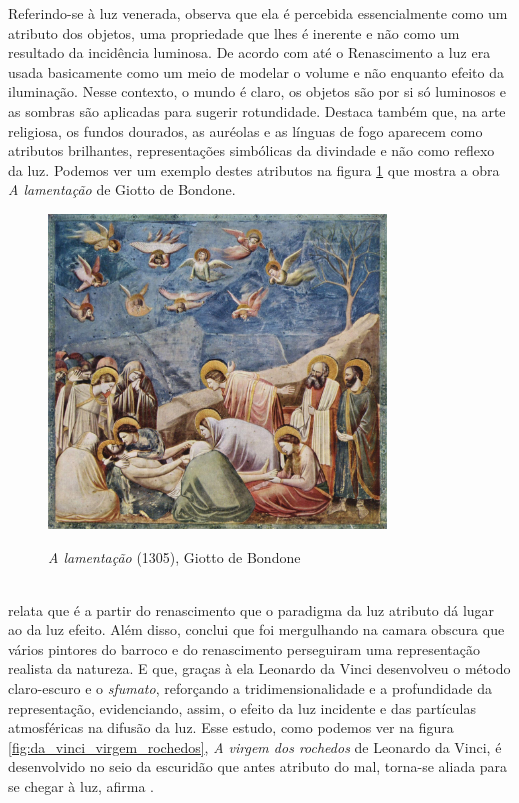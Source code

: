 Referindo-se à luz venerada,  observa que ela é percebida essencialmente como um atributo dos objetos, uma propriedade que lhes é inerente e não como um resultado da incidência luminosa. De acordo com  até o Renascimento a luz era usada basicamente como um meio de modelar o volume e não enquanto efeito da iluminação. Nesse contexto, o mundo é claro, os objetos são por si só luminosos e as sombras são aplicadas para sugerir rotundidade. Destaca também que, na arte religiosa, os fundos dourados, as auréolas e as línguas de fogo aparecem como atributos brilhantes, representações simbólicas da divindade e não como reflexo da luz. Podemos ver um exemplo destes atributos na figura \ref{fig:giotto_lamentacao} que mostra a obra \textit{A lamentação} de Giotto de Bondone.

\begin{figure}[H]
    \centering
    \caption{\textit{A lamentação} (1305), Giotto de Bondone}
	\vspace*{0,2cm}
    \includegraphics[width=0.8\textwidth]{./04-figuras/giotto_lamentacao}
    \label{fig:giotto_lamentacao}
\end{figure}
\vspace*{-0,9cm}
{\raggedright {}}\\

 relata que é a partir do renascimento que o paradigma da luz atributo dá lugar ao da luz efeito. Além disso, conclui que foi mergulhando na camara obscura que vários pintores do barroco e do renascimento perseguiram uma representação realista da natureza. E que, graças à ela Leonardo da Vinci desenvolveu o método claro-escuro e o \textit{sfumato}, reforçando a tridimensionalidade e a profundidade da representação, evidenciando, assim, o efeito da luz incidente e das partículas atmosféricas na difusão da luz. Esse estudo,  como podemos ver na figura \ref{fig:da_vinci_virgem_rochedos}, \textit{A virgem dos rochedos} de Leonardo da Vinci, é desenvolvido no seio da escuridão que antes atributo do mal, torna-se aliada para se chegar à luz, afirma .

